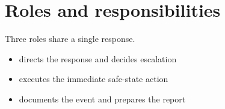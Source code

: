 \section{Roles and responsibilities}
\label{sec:b}

Three roles share a single response.

\begin{itemize}[leftmargin=3.4em,itemsep=3pt]
\item[\texttt{Lead}] directs the response and decides escalation
\item[\texttt{Assist}] executes the immediate safe-state action
\item[\texttt{Reserve}] documents the event and prepares the report
\end{itemize}
